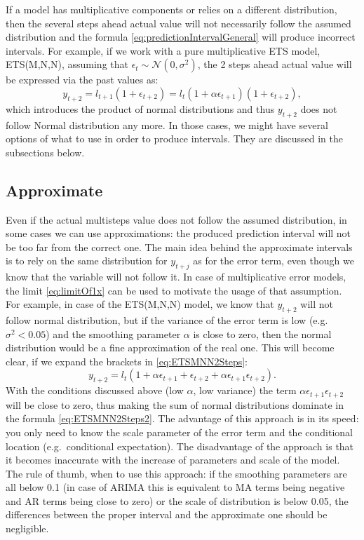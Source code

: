 \documentclass[
]{book}
\theoremstyle{definition}
\theoremstyle{definition}
\theoremstyle{definition}
\theoremstyle{definition}
\theoremstyle{remark}
\begin{document}
If a model has multiplicative components or relies on a different distribution, then the several steps ahead actual value will not necessarily follow the assumed distribution and the formula \eqref{eq:predictionIntervalGeneral} will produce incorrect intervals. For example, if we work with a pure multiplicative ETS model, ETS(M,N,N), assuming that \(\epsilon_t \sim \mathcal{N}(0, \sigma^2)\), the 2 steps ahead actual value will be expressed via the past values as:
\begin{equation}
    y_{t+2} = l_{t+1} (1+\epsilon_{t+2}) = l_{t} (1+\alpha \epsilon_{t+1}) (1+\epsilon_{t+2}) ,
    \label{eq:ETSMNN2Steps}
\end{equation}
which introduces the product of normal distributions and thus \(y_{t+2}\) does not follow Normal distribution any more. In those cases, we might have several options of what to use in order to produce intervals. They are discussed in the subsections below.

\hypertarget{approximate}{%
\subsection{Approximate}\label{approximate}}

Even if the actual multisteps value does not follow the assumed distribution, in some cases we can use approximations: the produced prediction interval will not be too far from the correct one. The main idea behind the approximate intervals is to rely on the same distribution for \(y_{t+j}\) as for the error term, even though we know that the variable will not follow it. In case of multiplicative error models, the limit \eqref{eq:limitOf1x} can be used to motivate the usage of that assumption. For example, in case of the ETS(M,N,N) model, we know that \(y_{t+2}\) will not follow normal distribution, but if the variance of the error term is low (e.g.~\(\sigma^2 < 0.05\)) and the smoothing parameter \(\alpha\) is close to zero, then the normal distribution would be a fine approximation of the real one. This will become clear, if we expand the brackets in \eqref{eq:ETSMNN2Steps}:
\begin{equation}
    y_{t+2} = l_{t} (1 + \alpha \epsilon_{t+1} + \epsilon_{t+2} + \alpha \epsilon_{t+1} \epsilon_{t+2}) .
    \label{eq:ETSMNN2Steps2}
\end{equation}
With the conditions discussed above (low \(\alpha\), low variance) the term \(\alpha \epsilon_{t+1} \epsilon_{t+2}\) will be close to zero, thus making the sum of normal distributions dominate in the formula \eqref{eq:ETSMNN2Steps2}. The advantage of this approach is in its speed: you only need to know the scale parameter of the error term and the conditional location (e.g.~conditional expectation). The disadvantage of the approach is that it becomes inaccurate with the increase of parameters and scale of the model. The rule of thumb, when to use this approach: if the smoothing parameters are all below 0.1 (in case of ARIMA this is equivalent to MA terms being negative and AR terms being close to zero) or the scale of distribution is below 0.05, the differences between the proper interval and the approximate one should be negligible.
\end{document}

